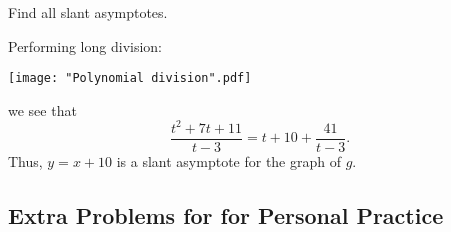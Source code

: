 \documentclass[nooutcomes]{ximera}
\renewenvironment{freeResponse}{
\ifhandout\setbox0\vbox\bgroup\else
\begin{trivlist}\item[\hskip \labelsep\bfseries Solution:\hspace{2ex}]
\fi}
{\ifhandout\egroup\else
\end{trivlist}
\fi}
\begin{document}
\begin{problem}
\begin{itemize}
    \item[(c)]
      Find all slant asymptotes.
      \begin{freeResponse}
        Performing long division:
        \begin{center}
          \texttt{[image: "Polynomial division".pdf]}
        \end{center}
        we see that
        \[
          \frac{t^2 + 7t + 11}{t-3} = t + 10 + \frac{41}{t-3}.
        \] 
        Thus, $y = x+10$ is a slant asymptote for the graph of $g$.
      \end{freeResponse}
  \end{itemize}
\end{problem}

\subsection*{Extra Problems for for Personal Practice}
\label{section:extra-problems}




\end{document}
